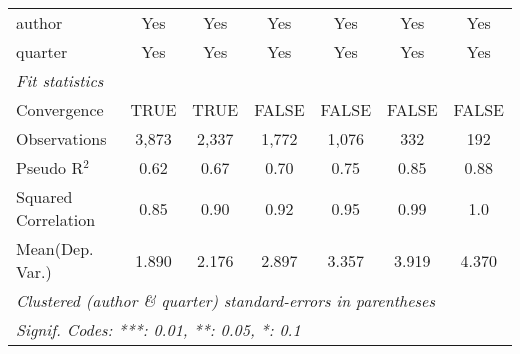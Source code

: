 \begin{tabular}{lcccccc}
   author                                                     & Yes           & Yes           & Yes          & Yes           & Yes           & Yes\\  
   quarter                                                    & Yes           & Yes           & Yes          & Yes           & Yes           & Yes\\  
   \midrule
   \emph{Fit statistics}\\
   Convergence                                                &TRUE           & TRUE          & FALSE        & FALSE         & FALSE         & FALSE\\  
   Observations                                               & 3,873         & 2,337         & 1,772        & 1,076         & 332           & 192\\  
   Pseudo R$^2$                                               & 0.62          & 0.67          & 0.70         & 0.75          & 0.85          & 0.88\\  
   Squared Correlation                                        & 0.85          & 0.90          & 0.92         & 0.95          & 0.99          & 1.0\\  
Mean(Dep. Var.) & 1.890 & 2.176 & 2.897 & 3.357 & 3.919 & 4.370 \\
   \midrule \midrule
   \multicolumn{7}{l}{\emph{Clustered (author \& quarter) standard-errors in parentheses}}\\
   \multicolumn{7}{l}{\emph{Signif. Codes: ***: 0.01, **: 0.05, *: 0.1}}\\
\end{tabular}
\par\endgroup
